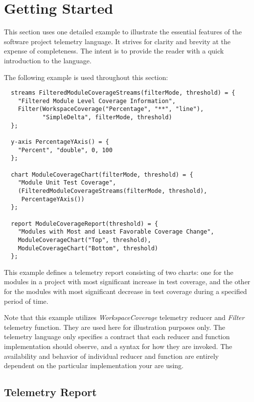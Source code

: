 \section{Getting Started}   \label{TelemetryLanguageSpecification:GettingStarted}

This section uses one detailed example to illustrate the essential features of the software project telemetry language. It strives for clarity and brevity at the expense of completeness. The intent is to provide the reader with a quick introduction to the language.

The following example is used throughout this section:
\begin{verbatim}
  streams FilteredModuleCoverageStreams(filterMode, threshold) = {
    "Filtered Module Level Coverage Information", 
    Filter(WorkspaceCoverage("Percentage", "**", "line"), 
           "SimpleDelta", filterMode, threshold) 
  };
  
  y-axis PercentageYAxis() = {
    "Percent", "double", 0, 100
  };
  
  chart ModuleCoverageChart(filterMode, threshold) = {
    "Module Unit Test Coverage", 
    (FilteredModuleCoverageStreams(filterMode, threshold), 
     PercentageYAxis()) 
  };
  
  report ModuleCoverageReport(threshold) = {
    "Modules with Most and Least Favorable Coverage Change",
    ModuleCoverageChart("Top", threshold),
    ModuleCoverageChart("Bottom", threshold)
  };
\end{verbatim}

This example defines a telemetry report consisting of two charts: one for the modules in a project with most significant increase in test coverage, and the other for the modules with most significant decrease in test coverage during a specified period of time.

Note that this example utilizes \textit{WorkspaceCoverage} telemetry reducer and \textit{Filter} telemetry function. They are used here for illustration purposes only. The telemetry language only specifies a contract that each reducer and function implementation should observe, and a syntax for how they are invoked. The availability and behavior of individual reducer and function are entirely dependent on the particular implementation your are using.


\subsection{Telemetry Report}

